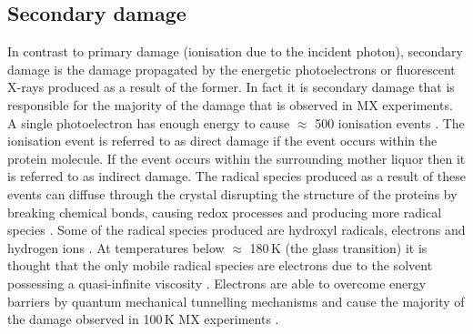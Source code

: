     \subsection{Secondary damage}
    \label{sub:Secondary damage}
        In contrast to primary damage (ionisation due to the incident photon), secondary damage is the damage propagated by the energetic photoelectrons or fluorescent X-rays produced as a result of the former.
        In fact it is secondary damage that is responsible for the majority of the damage that is observed in MX experiments.
        A single photoelectron has enough energy to cause $\approx$ 500 ionisation events \cite{o2002physical}. The ionisation event is referred to as direct damage if the event occurs within the protein molecule.
        If the event occurs within the surrounding mother liquor then it is referred to as indirect damage.
        The radical species produced as a result of these events can diffuse through the crystal disrupting the structure of the proteins by breaking chemical bonds, causing redox processes and producing more radical species \cite{meents2010}.
		Some of the radical species produced are hydroxyl radicals, electrons and hydrogen ions \cite{garman2010}.
        At temperatures below $\approx$ 180\,K (the glass transition) it is thought that the only mobile radical species are electrons \cite{jones1987structure} due to the solvent possessing a quasi-infinite viscosity \cite{weik2001specific}.
		Electrons are able to overcome energy barriers by quantum mechanical tunnelling mechanisms \cite{garman2009radiation} and cause the majority of the damage observed in 100\,K MX experiments \cite{garman2010}.

